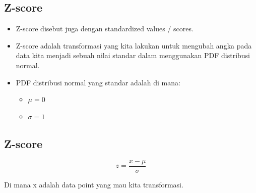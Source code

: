\documentclass[
  letterpaper,
  DIV=11,
  numbers=noendperiod]{scrartcl}
\begin{document}
\hypertarget{z-score}{%
\subsection{Z-score}\label{z-score}}

\begin{itemize}
\item
  Z-score disebut juga dengan standardized values / scores.
\item
  Z-score adalah transformasi yang kita lakukan untuk mengubah angka
  pada data kita menjadi sebuah nilai standar dalam menggunakan PDF
  distribusi normal.
\item
  PDF distribusi normal yang standar adalah di mana:

  \begin{itemize}
  \item
    \(\mu=0\)
  \item
    \(\sigma=1\)
  \end{itemize}
\end{itemize}

\hypertarget{z-score-1}{%
\subsection{Z-score}\label{z-score-1}}

\[
z=\frac{x-\mu}{\sigma}
\]

Di mana x adalah data point yang mau kita transformasi.
\end{document}
